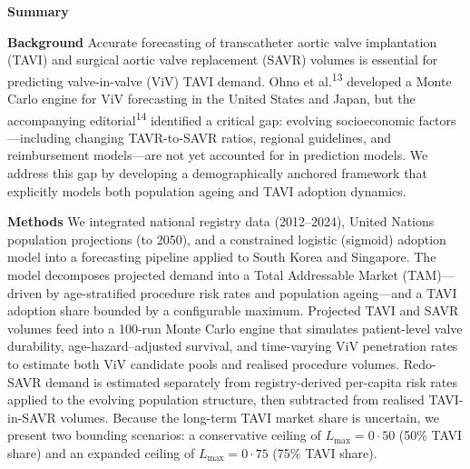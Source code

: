 \documentclass[10pt, a4paper]{article}
\begin{document}
\begin{lancetpanel}
{\large\bfseries\color{lancetred} Summary}
\vspace{6pt}

\small

\textbf{Background}\quad
Accurate forecasting of transcatheter aortic valve implantation (TAVI) and surgical aortic valve replacement (SAVR) volumes is essential for predicting valve-in-valve (ViV) TAVI demand. Ohno et al.\textsuperscript{13} developed a Monte Carlo engine for ViV forecasting in the United States and Japan, but the accompanying editorial\textsuperscript{14} identified a critical gap: evolving socioeconomic factors---including changing TAVR-to-SAVR ratios, regional guidelines, and reimbursement models---are not yet accounted for in prediction models. We address this gap by developing a demographically anchored framework that explicitly models both population ageing and TAVI adoption dynamics.

\vspace{4pt}
\textbf{Methods}\quad
We integrated national registry data (2012--2024), United Nations population projections (to 2050), and a constrained logistic (sigmoid) adoption model into a forecasting pipeline applied to South Korea and Singapore. The model decomposes projected demand into a Total Addressable Market (TAM)---driven by age-stratified procedure risk rates and population ageing---and a TAVI adoption share bounded by a configurable maximum. Projected TAVI and SAVR volumes feed into a 100-run Monte Carlo engine that simulates patient-level valve durability, age-hazard--adjusted survival, and time-varying ViV penetration rates to estimate both ViV candidate pools and realised procedure volumes. Redo-SAVR demand is estimated separately from registry-derived per-capita risk rates applied to the evolving population structure, then subtracted from realised TAVI-in-SAVR volumes. Because the long-term TAVI market share is uncertain, we present two bounding scenarios: a conservative ceiling of $L_{\max} = 0{\cdot}50$ (50\% TAVI share) and an expanded ceiling of $L_{\max} = 0{\cdot}75$ (75\% TAVI share).


\end{lancetpanel}
\end{document}
